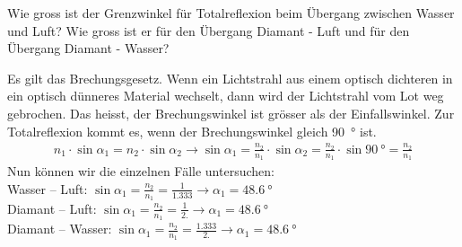 \documentclass[paper=a4,twoside=true,,DIV13,BCOR1cm]{scrartcl}
\begin{document}
\begin{aufgabe}
Wie gross ist der Grenzwinkel für Totalreflexion beim Übergang zwischen Wasser und Luft?
Wie gross ist er für den Übergang Diamant - Luft und für den Übergang Diamant - Wasser?	
\begin{loesung}
	Es gilt das Brechungsgesetz. Wenn ein Lichtstrahl aus einem optisch dichteren in ein optisch dünneres Material wechselt,
	dann wird der Lichtstrahl vom Lot weg gebrochen. Das heisst, der Brechungswinkel ist grösser als der Einfallswinkel.
	Zur Totalreflexion kommt es, wenn der Brechungswinkel gleich \SI{90}{\degree} ist.
		\begin{eqnarray*}
			n_1\cdot\sin\alpha_1 = n_2\cdot\sin\alpha_2 \to \sin\alpha_1=\frac{n_2}{n_1}\cdot\sin\alpha_2=\frac{n_2}{n_1}\cdot\sin\SI{90}{\degree}=\frac{n_2}{n_1}
		\end{eqnarray*}
		Nun können wir die einzelnen Fälle untersuchen:\\
		Wasser -- Luft: $\sin\alpha_1=\frac{n_2}{n_1}=\frac{1}{\num{1.333}} \to \alpha_1=\SI{48.6}{\degree}$\\
		Diamant -- Luft: $\sin\alpha_1=\frac{n_2}{n_1}=\frac{1}{\num{2.}} \to \alpha_1=\SI{48.6}{\degree}$\\
		Diamant -- Wasser: $\sin\alpha_1=\frac{n_2}{n_1}=\frac{1.333}{\num{2.}} \to \alpha_1=\SI{48.6}{\degree}$\\\\

\end{loesung}
\end{aufgabe}
\end{document}
